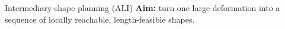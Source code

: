 \documentclass[aspectratio=169,10pt]{beamer}
\begin{document}
\begin{frame}[t]{Intermediary-shape planning (ALI)}
  {\small\color{IUDeepBlue}\textbf{Aim:} turn one large deformation into a
  sequence of locally reachable, length-feasible shapes.}

  \vspace{0.08cm}
  \begin{columns}[T,onlytextwidth]



\end{columns}
\end{frame}
\end{document}
